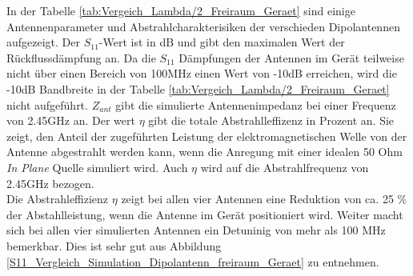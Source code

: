 In der Tabelle \ref{tab:Vergeich_Lambda/2_Freiraum_Geraet} sind einige Antennenparameter und Abstrahlcharakterisiken der verschieden Dipolantennen aufgezeigt. Der $S_{11}$-Wert ist in dB und gibt den maximalen Wert der Rückflussdämpfung an. Da die $S_{11}$ Dämpfungen der Antennen im Gerät teilweise nicht über einen Bereich von 100MHz einen  Wert von -10dB erreichen, wird die -10dB Bandbreite in der Tabelle \ref{tab:Vergeich_Lambda/2_Freiraum_Geraet} nicht aufgeführt.
$Z_{ant}$ gibt die simulierte Antennenimpedanz bei einer Frequenz von 2.45GHz an.
Der wert $\eta$ gibt die totale Abstrahlleffizenz in Prozent an. Sie zeigt, den Anteil der zugeführten Leistung der elektromagnetischen Welle von der Antenne abgestrahlt werden kann, wenn die Anregung mit einer idealen 50 Ohm \textit{In Plane} Quelle simuliert wird. Auch $\eta$ wird auf die Abstrahlfrequenz von 2.45GHz bezogen.\\
Die Abstrahleffizienz $\eta$ zeigt bei allen vier Antennen eine Reduktion von ca. 25 $\%$ der Abstahlleistung, wenn die Antenne im Gerät positioniert wird. Weiter macht sich bei allen vier simulierten Antennen ein Detuninig von mehr als 100 MHz bemerkbar. Dies ist sehr gut aus Abbildung \ref{S11_Vergleich_Simulation_Dipolantenn_freiraum_Geraet} zu entnehmen. 



